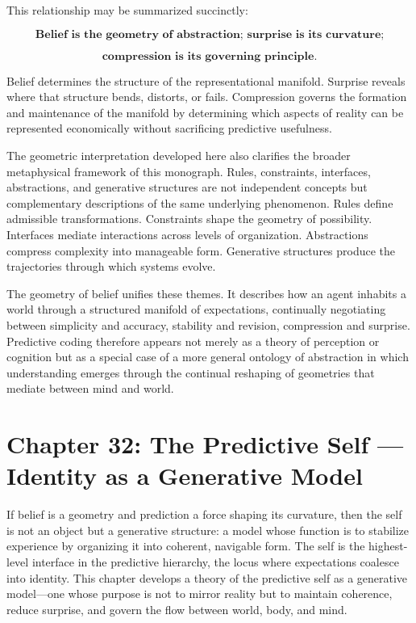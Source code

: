 \documentclass[12pt,letterpaper]{article}
\theoremstyle{remark}
\begin{document}
This relationship may be summarized succinctly:

\[
\textbf{Belief is the geometry of abstraction; surprise is its curvature;}
\]

\[
\textbf{compression is its governing principle.}
\]

Belief determines the structure of the representational manifold. Surprise reveals where that structure bends, distorts, or fails. Compression governs the formation and maintenance of the manifold by determining which aspects of reality can be represented economically without sacrificing predictive usefulness.

The geometric interpretation developed here also clarifies the broader metaphysical framework of this monograph. Rules, constraints, interfaces, abstractions, and generative structures are not independent concepts but complementary descriptions of the same underlying phenomenon. Rules define admissible transformations. Constraints shape the geometry of possibility. Interfaces mediate interactions across levels of organization. Abstractions compress complexity into manageable form. Generative structures produce the trajectories through which systems evolve.

The geometry of belief unifies these themes. It describes how an agent inhabits a world through a structured manifold of expectations, continually negotiating between simplicity and accuracy, stability and revision, compression and surprise. Predictive coding therefore appears not merely as a theory of perception or cognition but as a special case of a more general ontology of abstraction in which understanding emerges through the continual reshaping of geometries that mediate between mind and world.

\newpage
\section{Chapter 32: The Predictive Self — Identity as a Generative Model}

If belief is a geometry and prediction a force shaping its curvature, then the self is not an object but a generative structure: a model whose function is to stabilize experience by organizing it into coherent, navigable form. The self is the highest-level interface in the predictive hierarchy, the locus where expectations coalesce into identity. This chapter develops a theory of the predictive self as a generative model—one whose purpose is not to mirror reality but to maintain coherence, reduce surprise, and govern the flow between world, body, and mind.
\end{document}
